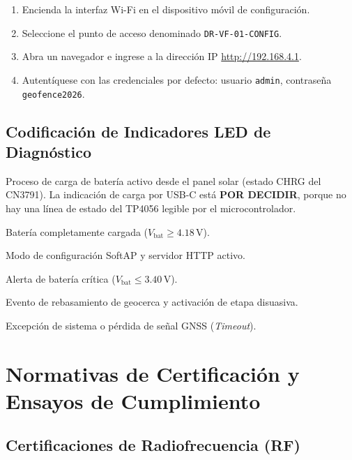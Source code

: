 \begin{enumerate}[leftmargin=*]
    \item Encienda la interfaz Wi-Fi en el dispositivo móvil de configuración.
    \item Seleccione el punto de acceso denominado \texttt{DR-VF-01-CONFIG}.
    \item Abra un navegador e ingrese a la dirección IP \url{http://192.168.4.1}.
    \item Autentíquese con las credenciales por defecto: usuario \texttt{admin}, contraseña \texttt{geofence2026}.
\end{enumerate}

\subsection{Codificación de Indicadores LED de Diagnóstico}

\begin{description}[leftmargin=*, style=nextline, font=\bfseries\ttfamily]
    \item[Verde Fijo] Proceso de carga de batería activo desde el panel solar (estado CHRG del CN3791). La indicación de carga por USB-C está \textbf{POR DECIDIR}, porque no hay una línea de estado del TP4056 legible por el microcontrolador.
    \item[Verde Parpadeante] Batería completamente cargada ($V_{\text{bat}} \ge 4.18\,\text{V}$).
    \item[Azul Parpadeante] Modo de configuración SoftAP y servidor HTTP activo.
    \item[Rojo Fijo] Alerta de batería crítica ($V_{\text{bat}} \le 3.40\,\text{V}$).
    \item[Rojo Parpadeante] Evento de rebasamiento de geocerca y activación de etapa disuasiva.
    \item[Amarillo Parpadeante] Excepción de sistema o pérdida de señal GNSS (\textit{Timeout}).
\end{description}

\section{Normativas de Certificación y Ensayos de Cumplimiento}

\subsection{Certificaciones de Radiofrecuencia (RF)}


